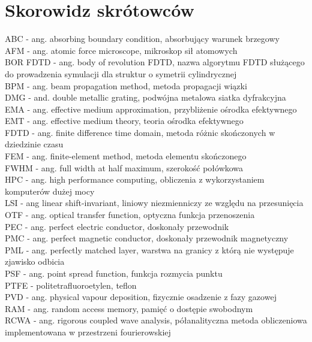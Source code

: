 \chapter*{Skorowidz skrótowców}
\noindent ABC - ang. absorbing boundary condition, absorbujący warunek brzegowy
\\AFM - ang. atomic force microscope, mikroskop sił atomowych
\\BOR FDTD - ang. body of revolution FDTD, nazwa algorytmu FDTD służącego do prowadzenia symulacji dla struktur o symetrii cylindrycznej 
\\BPM - ang. beam propagation method, metoda propagacji wiązki
\\DMG - and. double metallic grating, podwójna metalowa siatka dyfrakcyjna
\\EMA - ang. effective medium approximation, przybliżenie ośrodka efektywnego
\\EMT - ang. effective medium theory, teoria ośrodka efektywnego
\\FDTD - ang. finite difference time domain, metoda różnic skończonych w dziedzinie czasu
\\FEM - ang. finite-element method, metoda elementu skończonego
\\FWHM - ang. full width at half maximum, szerokość połówkowa
\\HPC - ang. high performance computing, obliczenia z wykorzystaniem komputerów dużej mocy
\\LSI - ang linear shift-invariant, liniowy niezmienniczy ze względu na przesunięcia
\\OTF - ang. optical transfer function, optyczna funkcja przenoszenia
\\PEC - ang. perfect electric conductor, doskonały przewodnik
\\PMC - ang. perfect magnetic conductor, doskonały przewodnik magnetyczny 
\\PML - ang. perfectly matched layer, warstwa na granicy z którą nie występuje zjawisko odbicia
\\PSF - ang. point spread function, funkcja rozmycia punktu
\\PTFE - politetrafluoroetylen, teflon
\\PVD - ang. physical vapour deposition, fizycznie osadzenie z fazy gazowej
\\RAM - ang. random access memory, pamięć o dostępie swobodnym
\\RCWA - ang. rigorous coupled wave analysis, półanalityczna metoda obliczeniowa implementowana w przestrzeni fourierowskiej
